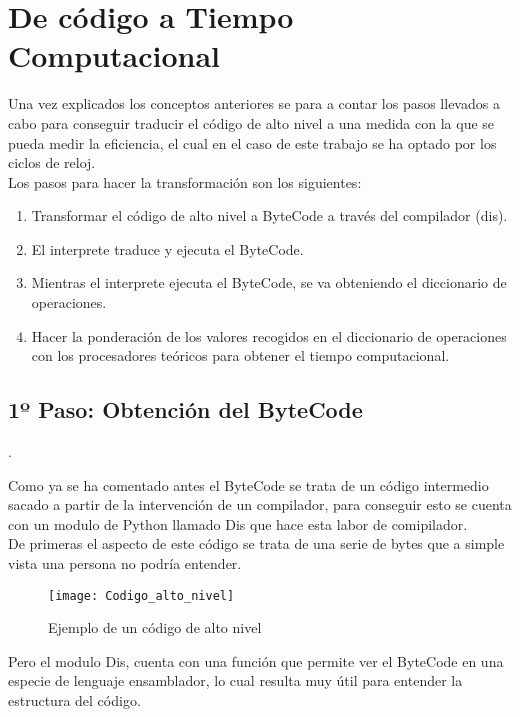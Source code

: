 \section{De código a Tiempo Computacional}

Una vez explicados los conceptos anteriores se para a contar los pasos llevados a cabo para conseguir traducir el código de alto nivel a una medida con la que se pueda medir la eficiencia,  el cual en el caso de este trabajo se ha optado por los ciclos de reloj.\\
Los pasos para hacer la transformación son los siguientes:\\
\begin{enumerate}
	\item Transformar el código de alto nivel a ByteCode a través del compilador (dis).
	\item El interprete traduce y ejecuta el ByteCode.
	\item Mientras el interprete ejecuta el ByteCode, se va obteniendo el diccionario de operaciones.
	\item Hacer la ponderación de los valores recogidos en el diccionario de operaciones con los procesadores teóricos para obtener el tiempo computacional.
\end{enumerate}


\subsection{1º Paso: Obtención del ByteCode}.

Como ya se ha  comentado antes el ByteCode se trata  de un código intermedio sacado  a partir de la intervención de un compilador, para conseguir esto se cuenta con un modulo de Python llamado Dis que hace esta labor de comipilador.\\
De primeras el aspecto de este código se trata de una serie de bytes que a simple vista una persona no podría entender.\\


\begin{figure}[htb]
\centering
\texttt{[image: Codigo\_alto\_nivel]}
\caption{Ejemplo de un código de alto nivel} \label{fig:horizonte}
\end{figure}

Pero el modulo Dis, cuenta con una función que permite ver el ByteCode en una especie de lenguaje ensamblador, lo cual resulta muy útil para entender la estructura del código.\\

